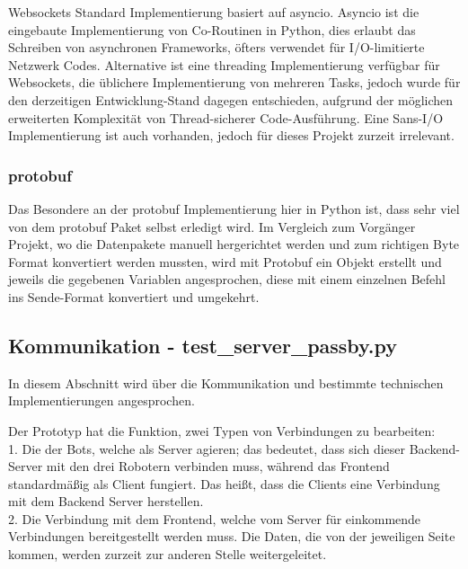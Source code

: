 Websockets Standard Implementierung basiert auf asyncio.
%  
Asyncio ist die eingebaute Implementierung von Co-Routinen in Python,
dies erlaubt das Schreiben von asynchronen Frameworks, 
öfters verwendet für I/O-limitierte Netzwerk Codes.
Alternative ist eine threading Implementierung verfügbar für Websockets, 
die üblichere Implementierung von mehreren Tasks, 
jedoch wurde für den derzeitigen Entwicklung-Stand dagegen entschieden,
aufgrund der möglichen erweiterten Komplexität von Thread-sicherer Code-Ausführung.
Eine Sans-I/O Implementierung ist auch vorhanden, 
jedoch für dieses Projekt zurzeit irrelevant.

\subsubsection{protobuf}
Das Besondere an der protobuf Implementierung hier in Python ist,
dass sehr viel von dem protobuf Paket selbst erledigt wird.
Im Vergleich zum Vorgänger Projekt, wo die Datenpakete manuell hergerichtet werden
und zum richtigen Byte Format konvertiert werden mussten, 
wird mit Protobuf ein Objekt erstellt 
und jeweils die gegebenen Variablen angesprochen, 
diese mit einem einzelnen Befehl ins Sende-Format konvertiert und umgekehrt.


\subsection{Kommunikation - test\_server\_passby.py}
In diesem Abschnitt wird über die Kommunikation 
und bestimmte technischen Implementierungen angesprochen.

Der Prototyp hat die Funktion, zwei Typen von Verbindungen zu bearbeiten: \\
%
1. Die der Bots, welche als Server agieren; 
das bedeutet, 
dass sich dieser Backend-Server mit den drei Robotern verbinden muss, 
während das Frontend standardmäßig als Client fungiert. 
Das heißt, dass die Clients eine Verbindung mit dem Backend Server herstellen. \\
% 
2. Die Verbindung mit dem Frontend, 
welche vom Server für einkommende Verbindungen bereitgestellt werden muss.
% 
Die Daten, die von der jeweiligen Seite kommen, 
werden zurzeit zur anderen Stelle weitergeleitet.

